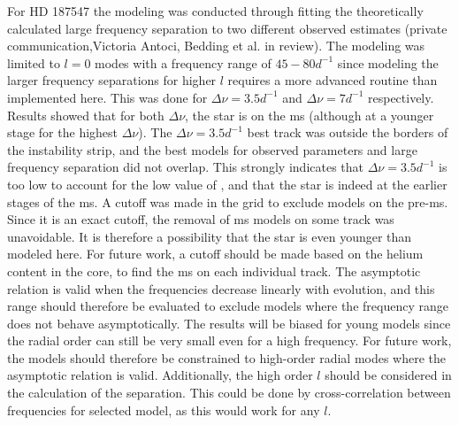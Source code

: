 For HD 187547 the modeling was conducted through fitting the theoretically calculated large frequency separation to two different observed estimates \citet{antoci2011excitation} (private communication,Victoria Antoci, Bedding et al. in review). The modeling was limited to $l=0$ modes with a frequency range of $45-80 d^{-1}$ since modeling the larger frequency separations for higher $l$ requires a more advanced routine than implemented here. This was done for $\Delta\nu = 3.5 d^{-1}$ and $\Delta\nu = 7 d^{-1}$ respectively. Results showed that for both $\Delta\nu$, the star is on the ms (although at a younger stage for the highest $\Delta\nu$). The  $\Delta\nu = 3.5 d^{-1}$ best track was outside the borders of the instability strip, and the best models \chis for observed parameters and large frequency separation did not overlap. This strongly indicates that $\Delta\nu = 3.5 d^{-1}$ is too low to account for the low value of \lum, and that the star is indeed at the earlier stages of the ms. A cutoff was made in the grid to exclude models on the pre-ms. Since it is an exact cutoff,  the removal of ms models on some track was unavoidable. It is therefore a possibility that the star is even younger than modeled here. For future work, a cutoff should be made based on the helium content in the core, to find the ms on each individual track. 
The asymptotic relation is valid when the frequencies decrease linearly with evolution, and this range should therefore be evaluated to exclude models where the frequency range does not behave asymptotically. The results will be biased for young models since the radial order can still be very small even for a high frequency. For future work, the models should therefore be constrained to high-order radial modes where the asymptotic relation is valid. Additionally, the high order $l$ should be considered in the calculation of the separation. This could be done by cross-correlation between frequencies for selected model, as this would work for any $l$. 

